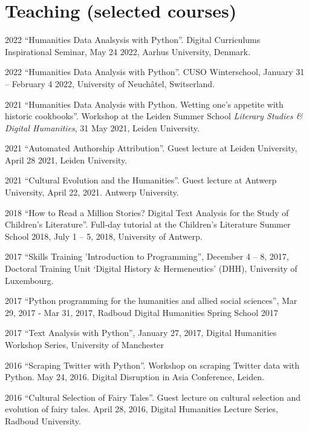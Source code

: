 \documentclass[12pt,letterpaper]{report}
\begin{document}
\section*{Teaching (selected courses)}
\begin{tablist}
  \item[2022] \tab{}``Humanities Data Analsysis with Python''. Digital Curriculums
    Inspirational Seminar, May 24 2022, Aarhus University, Denmark.
  \item[2022] \tab{}``Humanities Data Analysis with Python''. CUSO Winterschool, January 31 
    -- February 4 2022, University of Neuchâtel, Switserland. 
  \item[2021] \tab{}``Humanities Data Analysis with Python. Wetting one’s appetite with
    historic cookbooks''. Workshop at the Leiden Summer School \textit{Literary Studies \&
      Digital Humanities}, 31 May 2021, Leiden University.
  \item[2021] \tab{}``Automated Authorship Attribution''. Guest lecture at Leiden
    University, April 28 2021, Leiden University.     
  \item[2021] \tab{}``Cultural Evolution and the Humanities''. Guest lecture at Antwerp
    University, April 22, 2021. Antwerp University. 
  \item[2018] \tab{}``How to Read a Million Stories? Digital Text Analysis for the Study of
    Children's Literature''. Full-day tutorial at the Children’s Literature Summer School
    2018, July 1 -- 5, 2018, University of Antwerp.  
  \item[2017] \tab{}``Skills Training ’Introduction to Programming'', December 4 -- 8,
    2017, Doctoral Training Unit `Digital History \& Hermeneutics' (DHH), University of
    Luxembourg. 
  \item[2017] \tab{}``Python programming for the humanities and allied social sciences'',
    Mar 29, 2017 - Mar 31, 2017, Radboud Digital Humanities Spring School 2017
  \item[2017] \tab{}``Text Analysis with Python'', January 27, 2017, Digital Humanities
    Workshop Series, University of Manchester
  \item[2016] \tab{}``Scraping Twitter with Python''. Workshop on scraping Twitter data
    with Python. May 24, 2016. Digital Disruption in Asia Conference, Leiden. 
  \item[2016] \tab{}``Cultural Selection of Fairy Tales''. Guest lecture on cultural
    selection and evolution of fairy tales. April 28, 2016, Digital Humanities Lecture
    Series, Radboud University. 

\end{tablist}
\end{document}
